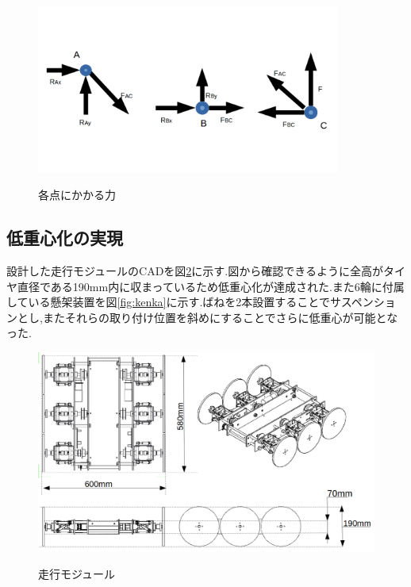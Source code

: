\documentclass[12pt,oneside]{sotsuken_paper}
\begin{document}
\begin{figure}[htp] 
 \begin{center} 
  \includegraphics[width=100mm]{img/hard/fig8.png} 
 　\caption{各点にかかる力} 
  \label{fig:bai}%
 \end{center} 
\end{figure} 




\subsection{低重心化の実現} 
設計した走行モジュールのCADを図\ref{fig:cad}に示す.図から確認できるように全高がタイヤ直径である190mm内に収まっているため低重心化が達成された.また6輪に付属している懸架装置を図\ref{fig:kenka}に示す.ばねを2本設置することでサスペンションとし,またそれらの取り付け位置を斜めにすることでさらに低重心が可能となった. 

\begin{figure}[htp] 
 \begin{center} 
  \includegraphics[width=150mm]{img/hard/4.png} 
 　\caption{走行モジュール} 
  \label{fig:cad}%
 \end{center} 
\end{figure} 
\end{document}
